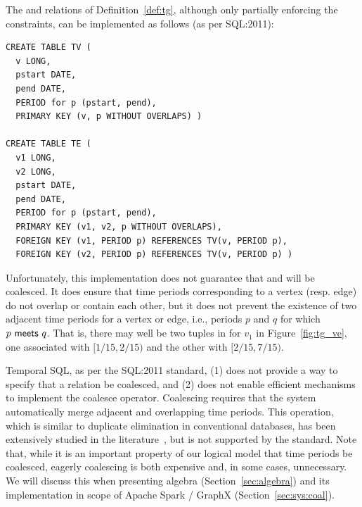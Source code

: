 The \tv and \te relations of Definition~\ref{def:tg}, although only
partially enforcing the constraints, can be implemented as follows (as
per SQL:2011):


\begin{small}
\begin{verbatim}
CREATE TABLE TV (
  v LONG,
  pstart DATE,
  pend DATE,
  PERIOD for p (pstart, pend),
  PRIMARY KEY (v, p WITHOUT OVERLAPS) )

CREATE TABLE TE (
  v1 LONG,
  v2 LONG,
  pstart DATE,
  pend DATE,
  PERIOD for p (pstart, pend),
  PRIMARY KEY (v1, v2, p WITHOUT OVERLAPS),
  FOREIGN KEY (v1, PERIOD p) REFERENCES TV(v, PERIOD p),
  FOREIGN KEY (v2, PERIOD p) REFERENCES TV(v, PERIOD p) )
\end{verbatim}
\end{small}

Unfortunately, this implementation does not guarantee that \tv and \te
will be coalesced.  It does ensure that time periods corresponding to
a vertex (resp. edge) do not overlap or contain each other, but it
does not prevent the existence of two adjacent time periods for a
vertex or edge, i.e., periods $p$ and $q$ for which
$p~\mathsf{meets}~q$.  That is, there may well be two tuples in \tv
for $v_1$ in Figure~\ref{fig:tg_ve}, one associated with $[1/15,
  2/15)$ and the other with $[2/15, 7/15)$.

Temporal SQL, as per the SQL:2011 standard, (1) does not provide a way
to specify that a relation be coalesced, and (2) does not enable
efficient mechanisms to implement the coalesce operator.  Coalescing
requires that the system automatically merge adjacent and overlapping
time periods.  This operation, which is similar to duplicate
elimination in conventional databases, has been extensively studied in
the
literature~\cite{DBLP:conf/vldb/BohlenSS96,DBLP:journals/sigmod/Zimanyi06},
but is not supported by the standard.  Note that, while it is an
important property of our logical model that time periods be
coalesced, eagerly coalescing is both expensive and, in some cases,
unnecessary.  We will discuss this when presenting \tg algebra
(Section~\ref{sec:algebra}) and its implementation in scope of Apache
Spark / GraphX (Section~\ref{sec:sys:coal}).

